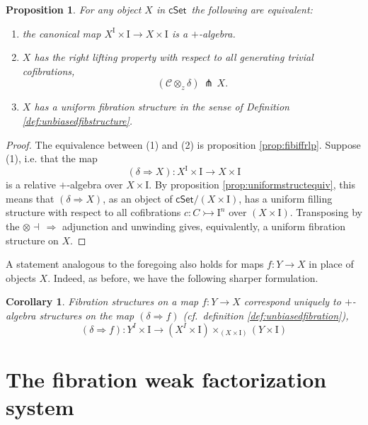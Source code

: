 \documentclass[11pt]{article}
\newcommand{\cSet}{\ensuremath{\mathsf{cSet}}}
\newcommand{\mono}{\ensuremath{\rightarrowtail}}
\newcommand{\ra}{\ensuremath{\rightarrow}}
\newcommand{\I}{\ensuremath{\mathrm{I}}}
\newtheorem{proposition}[theorem]{Proposition}
\newtheorem{corollary}[theorem]{Corollary}
\theoremstyle{remark}
\theoremstyle{definition}
\begin{document}
\begin{proposition}\label{prop:equivfibstruc} For any object $X$ in \cSet\ the following are equivalent:
\begin{enumerate}
\item the canonical map $X^\I\times \I \to X\times \I$ is a \emph{$+$-algebra}.

\item $X$ has the right lifting property with respect to all generating trivial cofibrations,
\[
(\mathcal{C}\otimes_z\delta)\, \pitchfork\,X.
\]

\item $X$ has a \emph{uniform fibration structure} in the sense of Definition \ref{def:unbiasedfibstructure}.
\end{enumerate}
\end{proposition}

\begin{proof}
The equivalence between (1) and (2) is proposition \ref{prop:fibiffrlp}.  Suppose (1), i.e. that the map
\[
(\delta\Rightarrow\!X) : X^\I\times \I \to X\times \I
\]
is a relative $+$-algebra over $X\times \I$.  By proposition \ref{prop:uniformstructequiv}, this means that $(\delta\Rightarrow\!X)$, as an object of $\cSet/(X\times \I)$, has a uniform filling structure with respect to all cofibrations $c :C\mono \I^n$ over $(X\times \I)$.  Transposing by the $\otimes\dashv\,\Rightarrow$ adjunction and unwinding gives, equivalently, a uniform fibration structure on $X$.
\end{proof}

A statement analogous to the foregoing also holds for maps $f:Y\ra X$ in place of objects $X$.  Indeed, as before, we have the following sharper formulation.

\begin{corollary}
Fibration structures on a map $f : Y\ra X$ correspond uniquely to $+$-algebra structures on the map $(\delta\Rightarrow{f})$ (cf.\ definition \ref{def:unbiasedfibration}),
\[
(\delta\Rightarrow{f}) : Y^I\times \I \to (X^I \times \I)\times_{(X\times \I)} (Y\times\I)
\]
\end{corollary}

\section{The fibration weak factorization system}\label{FWFS}
\end{document}
